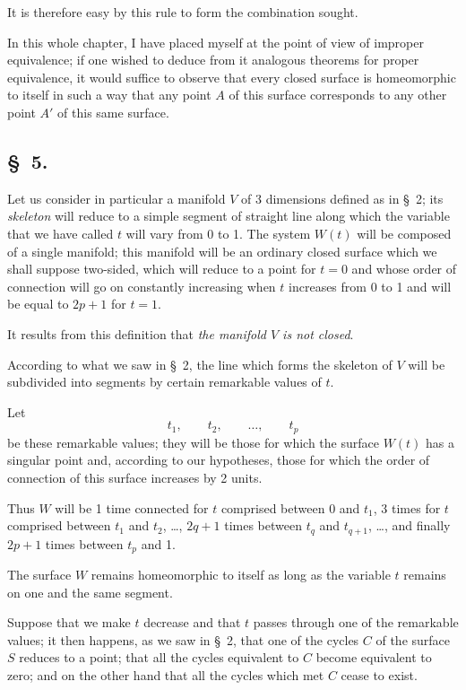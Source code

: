 \documentclass{article}
\begin{document}
It is therefore easy by this rule to form the combination sought.

In this whole chapter, I have placed myself at the point of view of improper equivalence; if one wished to deduce from it analogous theorems for proper equivalence, it would suffice to observe that every closed surface is homeomorphic to itself in such a way that any point $A$ of this surface corresponds to any other point $A'$ of this same surface.

\subsection*{\S~5.}

Let us consider in particular a manifold $V$ of 3 dimensions defined as in \S~2; its \emph{skeleton} will reduce to a simple segment of straight line along which the variable that we have called $t$ will vary from 0 to 1. The system $W(t)$ will be composed of a single manifold; this manifold will be an ordinary closed surface which we shall suppose two-sided, which will reduce to a point for $t = 0$ and whose order of connection will go on constantly increasing when $t$ increases from 0 to 1 and will be equal to $2p + 1$ for $t = 1$.

It results from this definition that \emph{the manifold $V$ is not closed}.

According to what we saw in \S~2, the line which forms the skeleton of $V$ will be subdivided into segments by certain remarkable values of $t$.

Let
\[ t_{1}, \qquad t_{2}, \qquad \ldots, \qquad t_{p} \]
be these remarkable values; they will be those for which the surface $W(t)$ has a singular point and, according to our hypotheses, those for which the order of connection of this surface increases by 2 units.


Thus $W$ will be 1 time connected for $t$ comprised between 0 and $t_{1}$, 3 times for $t$ comprised between $t_{1}$ and $t_{2}$, \ldots, $2q + 1$ times between $t_{q}$ and $t_{q+1}$, \ldots, and finally $2p + 1$ times between $t_{p}$ and 1.

The surface $W$ remains homeomorphic to itself as long as the variable $t$ remains on one and the same segment.

Suppose that we make $t$ decrease and that $t$ passes through one of the remarkable values; it then happens, as we saw in \S~2, that one of the cycles $C$ of the surface $S$ reduces to a point; that all the cycles equivalent to $C$ become equivalent to zero; and on the other hand that all the cycles which met $C$ cease to exist.
\end{document}
